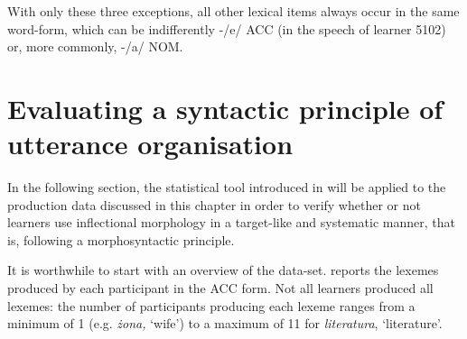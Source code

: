 With only these three exceptions, all other lexical items always occur in the same word-form, which can be indifferently -/e/ ACC (in the speech of learner 5102) or, more commonly, -/a/ NOM. 

\section{Evaluating a syntactic principle of utterance organisation}\label{sec:07:3}

In the following section, the statistical tool introduced in  will be applied to the production data discussed in this chapter in order to verify whether or not learners use inflectional morphology in a target-like and systematic manner, that is, following a morphosyntactic principle.

It is worthwhile to start with an overview of the data-set.  reports the lexemes produced by each participant in the ACC form. Not all learners produced all lexemes: the number of participants producing each lexeme ranges from a minimum of 1 (e.g. \textit{żona,} ‘wife’) to a maximum of 11 for \textit{literatura}, ‘literature’. 

